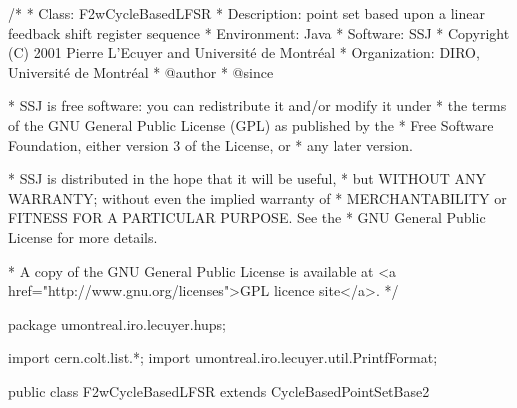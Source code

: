 \begin{code}
\begin{hide}
/*
 * Class:        F2wCycleBasedLFSR
 * Description:  point set based upon a linear feedback shift register
                 sequence
 * Environment:  Java
 * Software:     SSJ 
 * Copyright (C) 2001  Pierre L'Ecuyer and Université de Montréal
 * Organization: DIRO, Université de Montréal
 * @author       
 * @since

 * SSJ is free software: you can redistribute it and/or modify it under
 * the terms of the GNU General Public License (GPL) as published by the
 * Free Software Foundation, either version 3 of the License, or
 * any later version.

 * SSJ is distributed in the hope that it will be useful,
 * but WITHOUT ANY WARRANTY; without even the implied warranty of
 * MERCHANTABILITY or FITNESS FOR A PARTICULAR PURPOSE.  See the
 * GNU General Public License for more details.

 * A copy of the GNU General Public License is available at
   <a href="http://www.gnu.org/licenses">GPL licence site</a>.
 */
\end{hide}
package umontreal.iro.lecuyer.hups; \begin{hide}
import cern.colt.list.*;
import umontreal.iro.lecuyer.util.PrintfFormat;
\end{hide}


public class F2wCycleBasedLFSR extends CycleBasedPointSetBase2 \begin{hide} {

   private F2wStructure param;
\end{hide}\end{code}


